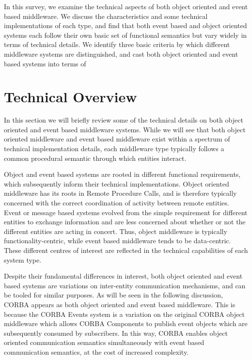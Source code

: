 \documentclass{acm_proc_article-sp}
\begin{document}
In this survey, we examine the technical aspects of both object oriented and event based middleware. We discuss the characteristics and some technical implementations of each type, and find that both event based and object oriented systems each follow their own basic set of functional semantics but vary widely in terms of technical details. We identify three basic criteria by which different middleware systems are distinguished, and cast both object oriented and event based systems into terms of 




\section{Technical Overview}
\label{sec:technical}


In this section we will briefly review some of the technical details on both object oriented and event based middleware systems. While we will see that both object oriented middleware and event based middleware exist within a spectrum of technical implementation details, each middleware type typically follows a common procedural semantic through which entities interact. 

Object and event based systems are rooted in different functional requirements, which subsequently inform their technical implementations. Object oriented middleware has its roots in Remote Procedure Calls, and is therefore typically concerned with the correct coordination of activity between remote entities. Event or message based systems evolved from the simple requirement for different entities to exchange information and are less concerned about whether or not the different entities are acting in concert. Thus, object middleware is typically functionality-centric, while event based middleware tends to be data-centric. These different centres of interest are reflected in the technical capabilities of each system type. 

Despite their fundamental differences in interest, both object oriented and event based systems are variations on inter-entity communication mechanisms, and can be tooled for similar purposes. As will be seen in the following discussion, CORBA appears as both object oriented and event based middleware. This is because the CORBA Events system is a variation on the original CORBA object middleware \cite{Siegel:1999p8569,Emmerich:2007p8368} which allows CORBA Components to publish event objects which are subsequently consumed by subscribers. In this way, CORBA enables object oriented communication semantics simultaneously with event based communication semantics, at the cost of increased complexity.
\end{document}

